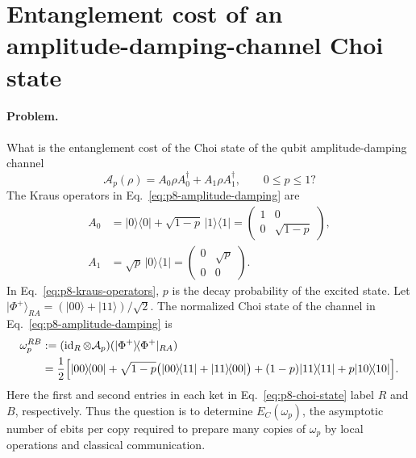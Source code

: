 \section{Entanglement cost of an amplitude-damping-channel Choi state}
\label{sec:problem-8}

\paragraph{Problem.}
What is the entanglement cost of the Choi state of the qubit
amplitude-damping channel
\begin{equation}
  \mathcal A_p(\rho)=A_0\rho A_0^\dagger+A_1\rho A_1^\dagger,
  \qquad 0\le p\le1?
  \label{eq:p8-amplitude-damping}
\end{equation}
The Kraus operators in Eq.~\eqref{eq:p8-amplitude-damping} are
\begin{equation}
  \begin{aligned}
    A_0&=\lvert0\rangle\!\langle0\rvert
         +\sqrt{1-p}\,\lvert1\rangle\!\langle1\rvert
       =\begin{pmatrix}1&0\\0&\sqrt{1-p}\end{pmatrix},\\
    A_1&=\sqrt p\,\lvert0\rangle\!\langle1\rvert
       =\begin{pmatrix}0&\sqrt p\\0&0\end{pmatrix}.
  \end{aligned}
  \label{eq:p8-kraus-operators}
\end{equation}
In Eq.~\eqref{eq:p8-kraus-operators}, $p$ is the decay probability of the
excited state.  Let
$\lvert\Phi^+\rangle_{RA}=(\lvert00\rangle+\lvert11\rangle)/\sqrt2$.
The normalized Choi state of the channel in
Eq.~\eqref{eq:p8-amplitude-damping} is
\begin{equation}
  \begin{aligned}
    \omega_p^{RB}
      &:=(\operatorname{id}_R\otimes\mathcal A_p)
          (\lvert\Phi^+\rangle\!\langle\Phi^+\rvert_{RA})\\
      &=\frac12\Bigl[
          \lvert00\rangle\!\langle00\rvert
          +\sqrt{1-p}\bigl(\lvert00\rangle\!\langle11\rvert
                           +\lvert11\rangle\!\langle00\rvert\bigr)
          +(1-p)\lvert11\rangle\!\langle11\rvert
          +p\lvert10\rangle\!\langle10\rvert
        \Bigr].
  \end{aligned}
  \label{eq:p8-choi-state}
\end{equation}
Here the first and second entries in each ket in
Eq.~\eqref{eq:p8-choi-state} label $R$ and $B$, respectively.  Thus the
question is to determine $E_C(\omega_p)$, the asymptotic number of ebits per
copy required to prepare many copies of $\omega_p$ by local operations and
classical communication.

